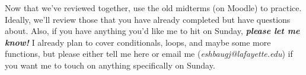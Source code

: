 \documentclass[11pt]{exam}
\begin{document}
    Now that we've reviewed together, use the old midterms (on Moodle) to practice.
    Ideally, we'll review those that you have already completed but have questions about.
    Also, if you have anything you'd like me to hit on Sunday, \textbf{\textit{please let me know!}}
    I already plan to cover conditionals, loops, and maybe some more functions, but please either tell me here or email me (\textit{eshbaugj@lafayette.edu}) if you want me to touch on anything specifically on Sunday.
\end{document}
